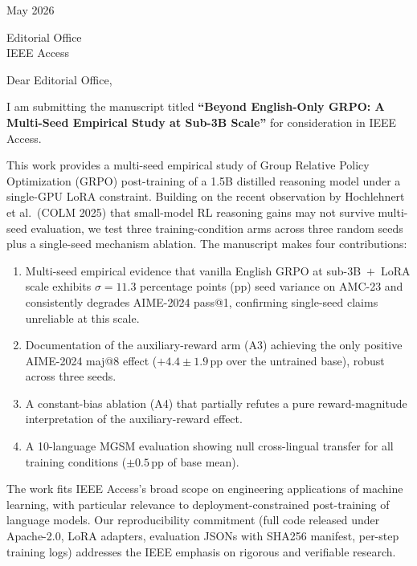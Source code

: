 \documentclass[11pt]{article}
\begin{document}
 May 2026

\bigskip

\noindent Editorial Office \\
IEEE Access

\vspace{1.5em}

\noindent Dear Editorial Office,

\medskip

I am submitting the manuscript titled \textbf{``Beyond English-Only GRPO:
A Multi-Seed Empirical Study at Sub-3B Scale''} for consideration in
IEEE Access.

This work provides a multi-seed empirical study of Group Relative Policy
Optimization (GRPO) post-training of a 1.5B distilled reasoning model under
a single-GPU LoRA constraint. Building on the recent observation by
Hochlehnert et al.~(COLM 2025) that small-model RL reasoning gains may not
survive multi-seed evaluation, we test three training-condition arms across
three random seeds plus a single-seed mechanism ablation. The manuscript
makes four contributions:

\begin{enumerate}
\item Multi-seed empirical evidence that vanilla English GRPO at
sub-3B~$+$~LoRA scale exhibits $\sigma = 11.3$ percentage points (pp) seed
variance on AMC-23 and consistently degrades AIME-2024 pass@1, confirming
single-seed claims unreliable at this scale.

\item Documentation of the auxiliary-reward arm (A3) achieving the only
positive AIME-2024 maj@8 effect ($+4.4 \pm 1.9$\,pp over the untrained
base), robust across three seeds.

\item A constant-bias ablation (A4) that partially refutes a pure
reward-magnitude interpretation of the auxiliary-reward effect.

\item A 10-language MGSM evaluation showing null cross-lingual transfer
for all training conditions ($\pm 0.5$\,pp of base mean).
\end{enumerate}

The work fits IEEE Access's broad scope on engineering applications of
machine learning, with particular relevance to deployment-constrained
post-training of language models. Our reproducibility commitment (full
code released under Apache-2.0, LoRA adapters, evaluation JSONs with
SHA256 manifest, per-step training logs) addresses the IEEE emphasis on
rigorous and verifiable research.
\end{document}
